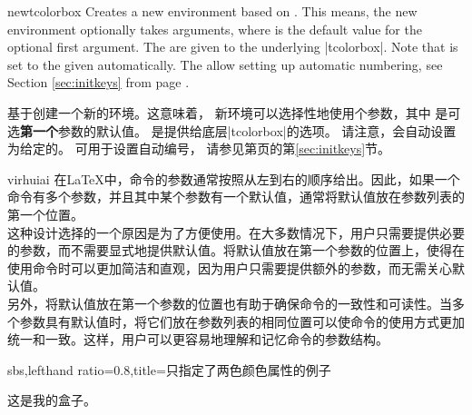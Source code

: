 \begin{docCommand}{newtcolorbox}{}
Creates a new environment  based on .
This means,
the new environment  optionally takes  arguments, where
 is the default value for the optional first argument.
The  are given to the underlying |tcolorbox|.
Note that  is set to the given 
automatically.
The  allow setting up automatic numbering,
see Section \ref{sec:initkeys} from page \pageref{sec:initkeys}.


基于创建一个新的环境。这意味着， 新环境可以选择性地使用个参数，其中 是可选{\bf 第一个}参数的默认值。 是提供给底层|tcolorbox|的选项。 请注意，会自动设置为给定的。 可用于设置自动编号， 请参见第\pageref{sec:initkeys}页的第\ref{sec:initkeys}节。

\begin{引述之言}{virhuiai}
在\LaTeX 中，命令的参数通常按照从左到右的顺序给出。因此，如果一个命令有多个参数，并且其中某个参数有一个默认值，通常将默认值放在参数列表的第一个位置。
\\[0.5em]
这种设计选择的一个原因是为了方便使用。在大多数情况下，用户只需要提供必要的参数，而不需要显式地提供默认值。将默认值放在第一个参数的位置上，使得在使用命令时可以更加简洁和直观，因为用户只需要提供额外的参数，而无需关心默认值。
\\[0.5em]
另外，将默认值放在第一个参数的位置也有助于确保命令的一致性和可读性。当多个参数具有默认值时，将它们放在参数列表的相同位置可以使命令的使用方式更加统一和一致。这样，用户可以更容易地理解和记忆命令的参数结构。
\end{引述之言}

\begin{dispExample*}{sbs,lefthand ratio=0.8,title=只指定了两色颜色属性的例子}
\begin{mybox}
这是我的盒子。
\end{mybox}
\end{dispExample*}


\end{docCommand}
